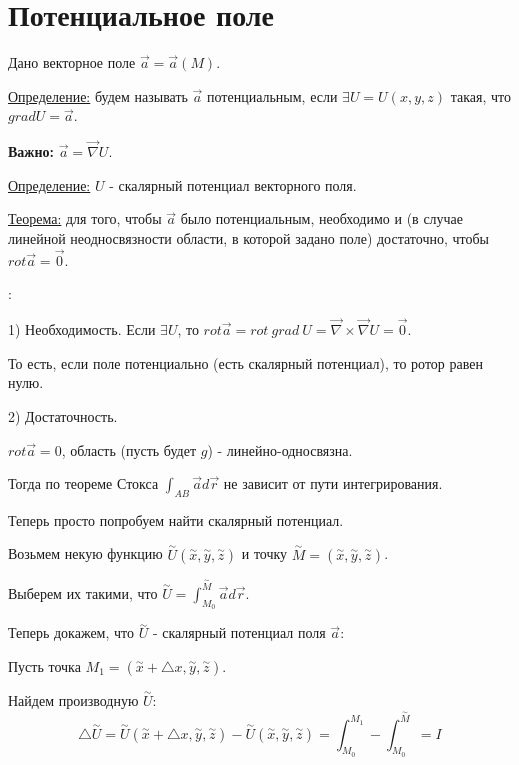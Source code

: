 \documentclass[12pt]{article}
\begin{document}
\section{Потенциальное поле}
Дано векторное поле $\overrightarrow{a} = \overrightarrow{a} (M)$.\par
\uline{Определение:} будем называть $\overrightarrow{a}$ потенциальным, если $\exists U = U(x,y,z)$ такая, что $grad U = \overrightarrow{a}$.\par
\textbf{Важно:} $\overrightarrow{a} = \overrightarrow{\nabla} U$.\par
\uline{Определение:} $U$ - скалярный потенциал векторного поля.\par
\uline{Теорема:} для того, чтобы $\overrightarrow{a}$ было потенциальным, необходимо и (в случае линейной неодносвязности области, в которой задано поле) достаточно, чтобы $rot \overrightarrow{a} = \overrightarrow{0}$.\par
{}:\par
1) Необходимость. Если $\exists U$, то $rot \overrightarrow{a} = rot \ grad \ U = \overrightarrow{\nabla} \times \overrightarrow{\nabla} U = \overrightarrow{0}$.\par
То есть, если поле потенциально (есть скалярный потенциал), то ротор равен нулю.\par
2) Достаточность.\par
$rot \overrightarrow{a} = 0$, область (пусть будет $g$) - линейно-односвязна.\par
Тогда по теореме Стокса $\int_{AB} \overrightarrow{a} d \overrightarrow{r}$ не зависит от пути интегрирования.\par
Теперь просто попробуем найти скалярный потенциал.\par
Возьмем некую функцию $\overset{\sim}{U}(\overset{\sim}{x},\overset{\sim}{y},\overset{\sim}{z})$ и точку $\overset{\sim}{M}=(\overset{\sim}{x},\overset{\sim}{y},\overset{\sim}{z})$.\par
Выберем их такими, что $\overset{\sim}{U} = \int_{M_0}^{\overset{\sim}{M}} \overrightarrow{a} d \overrightarrow{r}$.\par
Теперь докажем, что $\overset{\sim}{U}$ - скалярный потенциал поля $\overrightarrow{a}$:\par
Пусть точка $M_1 = (\overset{\sim}{x}+{\bigtriangleup x}, \overset{\sim}{y}, \overset{\sim}{z})$.\par
Найдем производную $\overset{\sim}{U}$:
$${\bigtriangleup \overset{\sim}{U}} = \overset{\sim}{U} (\overset{\sim}{x}+{\bigtriangleup x}, \overset{\sim}{y}, \overset{\sim}{z})-\overset{\sim}{U}(\overset{\sim}{x},\overset{\sim}{y},\overset{\sim}{z}) = \int_{M_0}^{M_1} - \int_{M_0}^{\overset{\sim}{M}} = I$$
\end{document}
